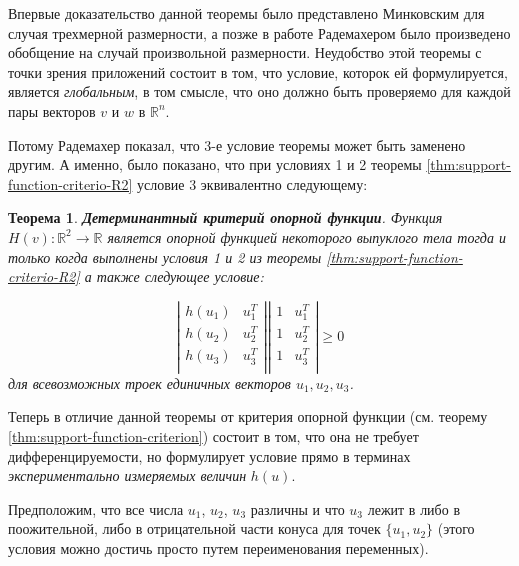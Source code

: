 \documentclass[a4paper, 12pt, titlepage]{article}
\theoremstyle{definition}
\theoremstyle{plain}
\newtheorem{SmartTheorem}{Теорема}
\begin{document}
Впервые доказательство данной теоремы было представлено Минковским для случая
трехмерной размерности, а позже в работе \cite{journals/mz/Rademacher22}
Радемахером было произведено обобщение на случай произвольной размерности.
Неудобство этой теоремы с точки зрения приложений состоит в том, что условие,
которок ей формулируется, является \textit{глобальным}, в том смысле, что оно
должно быть проверяемо для каждой пары векторов $v$ и $w$ в $\mathbb{R}^{n}$.

Потому Радемахер показал, что 3-е условие теоремы может быть заменено другим.
А именно, было показано, что при условиях 1 и 2 теоремы
\ref{thm:support-function-criterio-R2} условие 3 эквивалентно следующему:

\begin{SmartTheorem}
 \label{thm:support-function-criterio-R2-det}
 \textbf{Детерминантный критерий опорной функции}.
 Функция $H(v): \mathbb{R}^{2} \to \mathbb{R}$ является опорной функцией
 некоторого выпуклого тела тогда и только когда выполнены условия 1 и 2 из
 теоремы \ref{thm:support-function-criterio-R2} а также следующее условие:

\begin{equation}
 \left|\begin{array}{cc}
  h(u_{1}) & u_{1}^{T} \\
  h(u_{2}) & u_{2}^{T} \\
  h(u_{3}) & u_{3}^{T} \\
 \end{array}\right|
  \left|\begin{array}{cc}
  1 & u_{1}^{T} \\
  1 & u_{2}^{T} \\
  1 & u_{3}^{T} \\
 \end{array}\right|
 \geq 0
\end{equation}
для всевозможных троек единичных векторов $u_{1}, u_{2}, u_{3}$.
\end{SmartTheorem}

Теперь в отличие данной теоремы от критерия опорной функции (см. теорему
\ref{thm:support-function-criterion}) состоит в том, что она не требует
дифференцируемости, но формулирует условие прямо в терминах
\textit{экспериментально измеряемых величин} $h(u)$.

Предположим, что все числа $u_{1}$, $u_{2}$, $u_{3}$ различны и что $u_{3}$
лежит в либо в поожительной, либо в отрицательной части конуса для точек
$\{u_{1}, u_{2}\}$ (этого условия можно достичь просто путем переименования
переменных).
\end{document}
